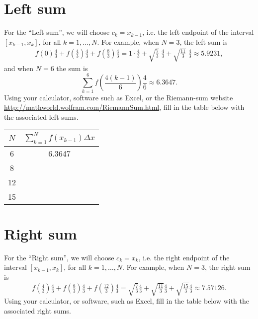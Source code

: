\section{Left  sum}
For the ``Left sum'', we will choose $c_k = x_{k-1}$, i.e. the left endpoint of
the interval $[x_{k-1},x_{k}]$, for all $k = 1,\dots,N$.  For example, when $N =
3$, the left sum is
\begin{align*}
  f(0)\tfrac{4}{3} 
  +f({\tfrac{4}{3}}) \tfrac{4}{3} 
  +f({\tfrac{8}{3}}) \tfrac{4}{3} = 1\cdot
  \tfrac{4}{3} 
  +\sqrt{{\tfrac{7}{3}}}\; \tfrac{4}{3} 
  +\sqrt{{\tfrac{11}{3}}}\; \tfrac{4}{3} 
  \approx  5.9231,
\end{align*}
and when $N = 6$ the sum is
\begin{equation}
  \label{eq:righthand-sum3}
  \sum_{k = 1}^{6} f\left( \frac{4(k-1)}{6} \right) \frac{4}{6} \approx 6.3647.
\end{equation}
Using your calculator, software such as Excel, or the Riemann-sum website
\url{http://mathworld.wolfram.com/RiemannSum.html}, fill in the table below with
the associated left sums.

\begin{center}
  \begin{tabular}{cc}
    \toprule
    \rule[-8pt]{0pt}{14pt}
    $N$ & $\sum_{k = 1}^{N} f(x_{k-1})\Delta x$\\
    \toprule
    6 & 6.3647 \\ \midrule
    8 & \\ \midrule
    12 & \\ \midrule
    15 & \\ \bottomrule
  \end{tabular}
\end{center}


\section{Right sum}
For the ``Right sum'', we will choose $c_k = x_{k}$, i.e. the right endpoint of
the interval $[x_{k-1},x_{k}]$, for all $k = 1,\dots,N$.  For example, when $N =
3$, the right sum is
\begin{equation}
  \label{eq:lefthand-sum3}
  f({\tfrac{4}{3}}) \tfrac{4}{3} + f({\tfrac{8}{3}}) \tfrac{4}{3} +
  f({\tfrac{12}{3}})\tfrac{4}{3} = \sqrt{\tfrac{7}{3}}\tfrac{4}{3} +
  \sqrt{\tfrac{11}{3}}\tfrac{4}{3} + \sqrt{\tfrac{15}{3}} \tfrac{4}{3} \approx
  7.57126.
\end{equation}
Using your calculator, or software, such as Excel, fill in the table below with
the associated right sums.


